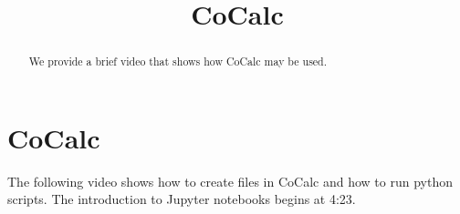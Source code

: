 \documentclass{ximera}
\title{CoCalc}
\begin{document}
  
\begin{abstract}  
We provide a brief video that shows how CoCalc may be used.
\end{abstract}  
\maketitle

\section{CoCalc}

The following video shows how to create files in CoCalc and how to run python scripts. The introduction to Jupyter notebooks begins at 4:23.

\end{document}
